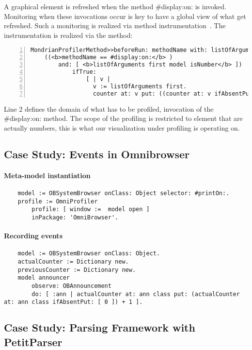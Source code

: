 \documentclass[runningheads]{llncs}
\begin{document}
A graphical element is refreshed when the method {\sf \#display:on:} is invoked. Monitoring when these invocations occur is key to have a global view of what get refreshed. Such a monitoring is realized via method instrumentation~\cite{Berg10d}. The instrumentation is realized via the method:

\begin{lstlisting}[numbers=left]
MondrianProfilerMethod>>beforeRun: methodName with: listOfArguments in: receiver
	((<b>methodName == #display:on:</b> ) 
		and: [ <b>listOfArguments first model isNumber</b> ])
			ifTrue: 
				[ | v |
				  v := listOfArguments first.
				  counter at: v put: ((counter at: v ifAbsentPut: [ 0 ]) + 1 ) ]
\end{lstlisting}

Line 2 defines the domain of what has to be profiled, invocation of the {\sf \#display:on:} method. The scope of the profiling is restricted to element that are actually numbers, this is what our visualization under profiling is operating on. 

\subsection{Case Study: Events in Omnibrowser}

\paragraph{Meta-model instantiation}
\begin{lstlisting}
	model := OBSystemBrowser onClass: Object selector: #printOn:.
	profile := OmniProfiler 
		profile: [ window :=  model open ]
		inPackage: 'OmniBrowser'.
\end{lstlisting}

\paragraph{Recording events}
\begin{lstlisting}
	model := OBSystemBrowser onClass: Object.
	actualCounter := Dictionary new.
	previousCounter := Dictionary new.
	model announcer
		observe: OBAnnouncement
		do: [ :ann | actualCounter at: ann class put: (actualCounter at: ann class ifAbsentPut: [ 0 ]) + 1 ].
\end{lstlisting}


\subsection{Case Study: Parsing Framework with PetitParser}
\end{document}
